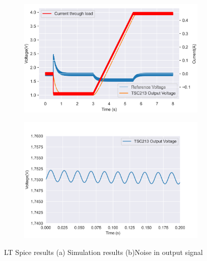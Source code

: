  \begin{figure}[!htb]
 \footnotesize
 \centering
    \begin{subfigure}[]{0.48\textwidth}
              \centering
  		\includegraphics[width=1\linewidth]{./Figures/circuit.png}
		    \caption{} \label{subfig:sim}
     \end{subfigure}
     \begin{subfigure}[]{0.5\textwidth}
             \centering
  		\includegraphics[width=1\linewidth]{./Figures/noise.png}
		   \caption{ } \label{subfig:noise}
     \end{subfigure}
   \caption[{Current Sense LTSpice Results}]{LT Spice results   (a)  Simulation results (b)Noise in output signal }
 
 \end{figure}

